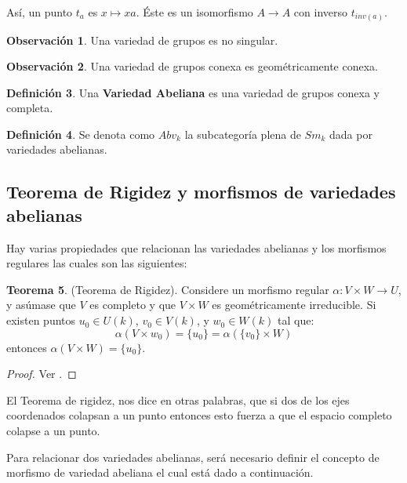 \documentclass[10pt]{amsart}
\theoremstyle{definition}
\newtheorem{definition}{Definici\'on}[section]
\newtheorem{obs}[definition]{Observaci\'on}
\newtheorem{theorem}[definition]{Teorema}
\theoremstyle{remark}
\theoremstyle{definition}
\begin{document}
Así, un punto $t_{a}$ es $x \mapsto xa$. Éste es un isomorfismo $A \rightarrow A$ con inverso $t_{inv(a)}$.

\begin{obs} Una variedad de grupos es no singular.
\end{obs}

\begin{obs} Una variedad de grupos conexa es geométricamente conexa.
\end{obs}

\begin{definition}
Una \textbf{Variedad Abeliana} es una variedad de grupos conexa y completa.
\end{definition}

\begin{definition}
Se denota como $Abv_{k}$ la subcategoría plena de $Sm_{k}$ dada por variedades abelianas. 
\end{definition}

\subsection{Teorema de Rigidez y morfismos de variedades abelianas}

Hay varias propiedades que relacionan las variedades abelianas y los morfismos regulares las cuales son las siguientes:

\begin{theorem} (Teorema de Rigidez). Considere un morfismo regular $\alpha:V \times W \rightarrow U$, y asúmase que $V$ es completo y que $V \times W$ es geométricamente irreducible. Si existen puntos $u_{0} \in U(\mathit{k})$, $v_{0} \in V(\mathit{k})$, y $w_{0} \in W(\mathit{k})$ tal que:
\begin{equation*}
\alpha(V \times w_{0})=\{u_0\}=\alpha(\{v_0\} \times W)
\end{equation*}
entonces $\alpha(V \times W)=\{u_0\}$.


\end{theorem}

\begin{proof}
Ver \cite[Thm. 1.1]{Mil}.
\end{proof}

El Teorema de rigidez, nos dice en otras palabras, que si dos de los ejes coordenados colapsan a un punto entonces esto fuerza a que el espacio completo colapse a un punto. 

Para relacionar dos variedades abelianas, será necesario definir el concepto de morfismo de variedad abeliana el cual está dado a continuación.
\end{document}
